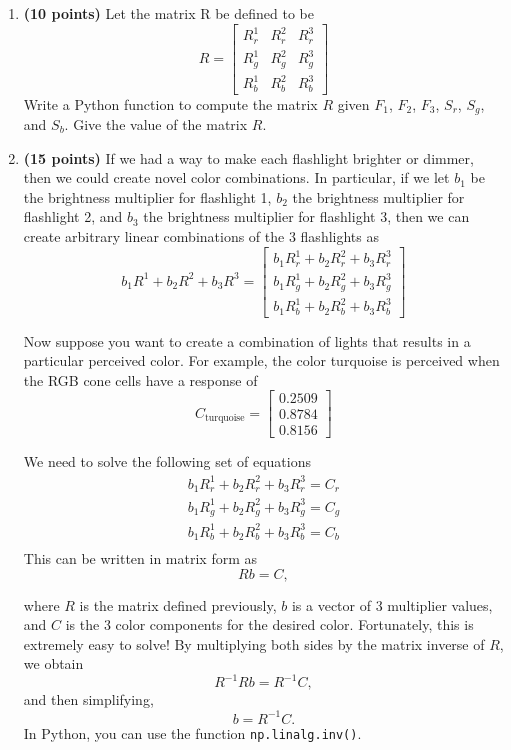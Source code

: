 \documentclass[10pt,letterpaper]{article}
\newcommand{\cmd}[1] {{\color{blue}\texttt{#1}}}
\begin{document}
\begin{enumerate}
\item \textbf{(10 points)} Let the matrix R be defined to be 
\[
	R = \left[ \begin{array}{ccc}
				R^1_r &  R^2_r & R^3_r\\
				R^1_g &  R^2_g & R^3_g\\
				R^1_b &  R^2_b & R^3_b\end{array} \right]
\]
Write a Python function to compute the matrix $R$ given $F_1$, $F_2$,
$F_3$, $S_r$, $S_g$, and $S_b$. Give the value of the matrix $R$.


\item \textbf{(15 points)} If we had a way to make each flashlight brighter or dimmer, then we could
create novel color combinations. In particular, if we let $b_1$ be the brightness
multiplier for flashlight 1, $b_2$ the brightness multiplier for flashlight 2, and $b_3$ the brightness multiplier for flashlight 3, then we can create arbitrary linear
combinations of the 3 flashlights as
\[
	b_1R^1 + b_2R^2 + b_3R^3 = \left[ \begin{array}{c}
				b_1R^1_r + b_2R^2_r + b_3R^3_r\\
				b_1R^1_g + b_2R^2_g + b_3R^3_g\\				
				b_1R^1_b + b_2R^2_b + b_3R^3_b\end{array} \right]
\]

Now suppose you want to create a combination of lights that results in a
particular perceived color. For example, the color turquoise is perceived when
the RGB cone cells have a response of
\[
C_{\text{turquoise}} = \left[ \begin{array}{c} 0.2509 \\ 0.8784 \\ 0.8156 \end{array} \right]
\]

We need to solve the following set of equations
\begin{eqnarray*}
b_1R^1_r + b_2R^2_r + b_3R^3_r = C_r\\
b_1R^1_g + b_2R^2_g + b_3R^3_g = C_g \\
b_1R^1_b + b_2R^2_b + b_3R^3_b = C_b \\
\end{eqnarray*}
This can be written in matrix form as
\[ Rb = C, \]

where $R$ is the matrix defined previously, $b$ is a vector of 3
multiplier values, and $C$ is the 3 color components for the desired
color. Fortunately, this is extremely easy to solve! By multiplying
both sides by the matrix inverse of $R$, we obtain
\[ R^{-1}Rb = R^{-1}C, \]
and then simplifying,
\[ b = R^{-1}C. \]
In Python, you can use the function \cmd{np.linalg.inv()}.


\end{enumerate}
\end{document}
